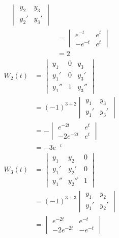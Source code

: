 \begin{ex}
\begin{align}
\begin{vmatrix}
               y_2 & y_3 \\
               y_2' & y_3'
             \end{vmatrix} \\
           &=
             \begin{vmatrix}
               e^{-t} & e^t \\
               -e^{-t} & e^t
             \end{vmatrix} \\
           &= 2
   \end{align}
  \begin{align}
    W_2(t) &=
           \begin{vmatrix}
             y_1 & 0 & y_3 \\
             y_1' & 0 & y_3' \\
             y_1'' & 1 & y_3''
           \end{vmatrix} \\
           &= (-1)^{3+2}
             \begin{vmatrix}
               y_1 & y_3 \\
               y_1' & y_3'
             \end{vmatrix} \\
           &= -
             \begin{vmatrix}
               e^{-2t} & e^t \\
               -2e^{-2t} & e^t
             \end{vmatrix} \\
           &= -3e^{-t}
   \end{align}
  \begin{align}
    W_3(t) &=
           \begin{vmatrix}
             y_1 & y_2 & 0 \\
             y_1' & y_2' & 0 \\
             y_1'' & y_2'' & 1
           \end{vmatrix} \\
           &= (-1)^{3+3}
             \begin{vmatrix}
               y_1 & y_2 \\
               y_1' & y_2'
             \end{vmatrix} \\
           &=
             \begin{vmatrix}
               e^{-2t} & e^{-t} \\
               -2e^{-2t} & -e^{-t}
             \end{vmatrix} \\

\end{align}
\end{ex}
